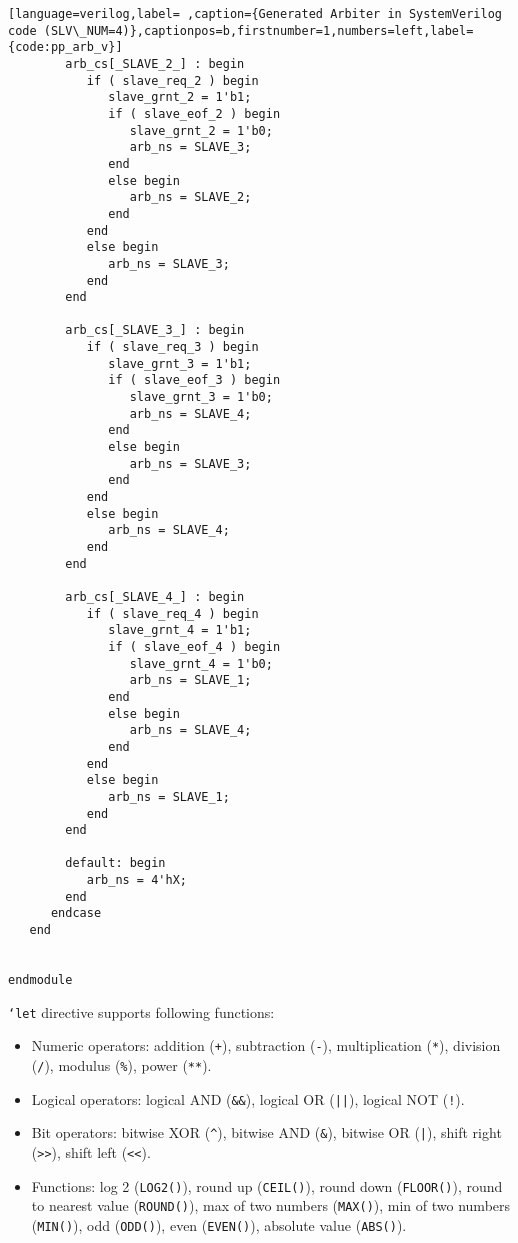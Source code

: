 \documentclass[10pt,oneside]{book}
\begin{document}
\begin{lstlisting}[language=verilog,label= ,caption={Generated Arbiter in SystemVerilog code (SLV\_NUM=4)},captionpos=b,firstnumber=1,numbers=left,label={code:pp_arb_v}]
        arb_cs[_SLAVE_2_] : begin
           if ( slave_req_2 ) begin
              slave_grnt_2 = 1'b1;
              if ( slave_eof_2 ) begin
                 slave_grnt_2 = 1'b0;
                 arb_ns = SLAVE_3;
              end
              else begin
                 arb_ns = SLAVE_2;
              end
           end
           else begin
              arb_ns = SLAVE_3;
           end
        end

        arb_cs[_SLAVE_3_] : begin
           if ( slave_req_3 ) begin
              slave_grnt_3 = 1'b1;
              if ( slave_eof_3 ) begin
                 slave_grnt_3 = 1'b0;
                 arb_ns = SLAVE_4;
              end
              else begin
                 arb_ns = SLAVE_3;
              end
           end
           else begin
              arb_ns = SLAVE_4;
           end
        end

        arb_cs[_SLAVE_4_] : begin
           if ( slave_req_4 ) begin
              slave_grnt_4 = 1'b1;
              if ( slave_eof_4 ) begin
                 slave_grnt_4 = 1'b0;
                 arb_ns = SLAVE_1;
              end
              else begin
                 arb_ns = SLAVE_4;
              end
           end
           else begin
              arb_ns = SLAVE_1;
           end
        end

        default: begin
           arb_ns = 4'hX;
        end
      endcase
   end


endmodule   
\end{lstlisting}



\texttt{`let} directive supports following functions:

\begin{itemize}
\item Numeric operators: addition (\texttt{+}), subtraction (\texttt{-}), multiplication
(\texttt{*}), division (\texttt{/}), modulus (\texttt{\%}), power (\texttt{**}).

\item Logical operators: logical AND (\texttt{\&\&}), logical OR (\texttt{||}), logical
NOT (\texttt{!}).

\item Bit operators: bitwise XOR (\texttt{\textasciicircum{}}), bitwise AND (\texttt{\&}), bitwise OR (\texttt{|}),
shift right (\texttt{>{}>{}}), shift left (\texttt{<{}<{}}).

\item Functions: log 2 (\texttt{LOG2()}), round up (\texttt{CEIL()}), round down (\texttt{FLOOR()}),
round to nearest value (\texttt{ROUND()}), max of two numbers (\texttt{MAX()}), min of
two numbers (\texttt{MIN()}), odd (\texttt{ODD()}), even (\texttt{EVEN()}), absolute value
(\texttt{ABS()}).
\end{itemize}
\end{document}

